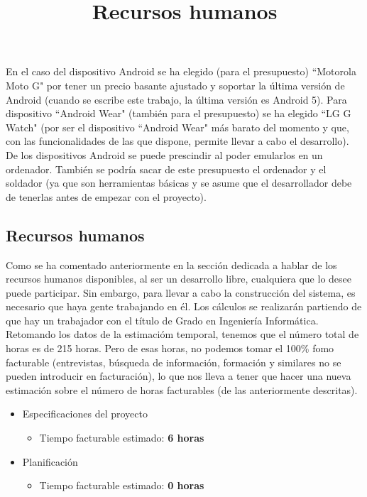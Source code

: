 En el caso del dispositivo Android se ha elegido (para el presupuesto) ``Motorola Moto G" por tener
un precio basante ajustado y soportar la última versión de Android (cuando se escribe este
trabajo, la última versión es Android 5). Para dispositivo ``Android Wear" (también para el presupuesto)
se ha elegido ``LG G Watch" (por ser el dispositivo ``Android Wear" más barato del momento
y que, con las funcionalidades de las que dispone, permite llevar a cabo el desarrollo). De los dispositivos
Android se puede prescindir al poder emularlos en un ordenador. También se podría sacar
de este presupuesto el ordenador y el soldador (ya que son herramientas básicas y se asume
que el desarrollador debe de tenerlas antes de empezar con el proyecto).\\

\subsection{Recursos humanos}
\title{Recursos humanos}

Como se ha comentado anteriormente en la sección dedicada a hablar de los recursos humanos disponibles,
al ser un desarrollo libre, cualquiera que lo desee puede participar. Sin embargo, para llevar a cabo la
construcción del sistema, es necesario que haya gente trabajando en él. Los cálculos
se realizarán partiendo de que hay un trabajador con el título de Grado en Ingeniería Informática.\\

Retomando los datos de la estimacióm temporal, tenemos que el número total de horas es
de 215 horas. Pero de esas horas, no podemos tomar el 100\% fomo facturable (entrevistas,
búsqueda de información, formación y similares no se pueden introducir en facturación),
lo que nos lleva a tener que hacer una nueva estimación sobre el número de horas facturables
(de las anteriormente descritas).\\


\begin{itemize}
  \item Especificaciones del proyecto
  \begin{itemize}
    \item{Tiempo facturable estimado: \textbf{6 horas}}
  \end{itemize}
\end{itemize}

\begin{itemize}
  \item Planificación
  \begin{itemize}
    \item{Tiempo facturable estimado: \textbf{0 horas}}
  \end{itemize}
\end{itemize}

